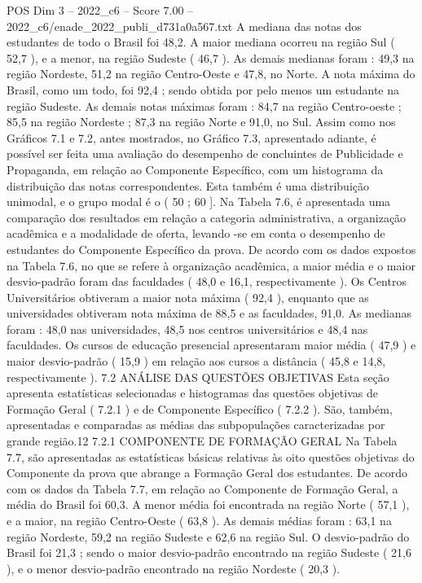 \begin{textsample}{POS Dim 3 – 2022\_c6 – Score 7.00 – 2022\_c6/enade\_2022\_publi\_d731a0a567.txt}
A mediana das notas dos estudantes de todo o Brasil foi 48,2.
A maior mediana ocorreu na região Sul ( 52,7 ), e a menor, na região Sudeste ( 46,7 ).
As demais medianas foram : 49,3 na região Nordeste, 51,2 na região Centro-Oeste e 47,8, no Norte.
A nota máxima do Brasil, como um todo, foi 92,4 ; sendo obtida por pelo menos um estudante na região Sudeste.
As demais notas máximas foram : 84,7 na região Centro-oeste ; 85,5 na região Nordeste ; 87,3 na região Norte e 91,0, no Sul.
Assim como nos Gráficos 7.1 e 7.2, antes mostrados, no Gráfico 7.3, apresentado adiante, é possível ser feita uma avaliação do desempenho de concluintes de Publicidade e Propaganda, em relação ao Componente Específico, com um histograma da distribuição das notas correspondentes.
Esta também é uma distribuição unimodal, e o grupo modal é o ( 50 ; 60 ].
Na Tabela 7.6, é apresentada uma comparação dos resultados em relação a categoria administrativa, a organização acadêmica e a modalidade de oferta, levando -se em conta o desempenho de estudantes do Componente Específico da prova.
De acordo com os dados expostos na Tabela 7.6, no que se refere à organização acadêmica, a maior média e o maior desvio-padrão foram das faculdades ( 48,0 e 16,1, respectivamente ).
Os Centros Universitários obtiveram a maior nota máxima ( 92,4 ), enquanto que as universidades obtiveram nota máxima de 88,5 e as faculdades, 91,0.
As medianas foram : 48,0 nas universidades, 48,5 nos centros universitários e 48,4 nas faculdades.
Os cursos de educação presencial apresentaram maior média ( 47,9 ) e maior desvio-padrão ( 15,9 ) em relação aos cursos a distância ( 45,8 e 14,8, respectivamente ). 7.2 ANÁLISE DAS QUESTÕES OBJETIVAS Esta seção apresenta estatísticas selecionadas e histogramas das questões objetivas de Formação Geral ( 7.2.1 ) e de Componente Específico ( 7.2.2 ).
São, também, apresentadas e comparadas as médias das subpopulações caracterizadas por grande região.12 7.2.1 COMPONENTE DE FORMAÇÃO GERAL Na Tabela 7.7, são apresentadas as estatísticas básicas relativas às oito questões objetivas do Componente da prova que abrange a Formação Geral dos estudantes.
De acordo com os dados da Tabela 7.7, em relação ao Componente de Formação Geral, a média do Brasil foi 60,3.
A menor média foi encontrada na região Norte ( 57,1 ), e a maior, na região Centro-Oeste ( 63,8 ).
As demais médias foram : 63,1 na região Nordeste, 59,2 na região Sudeste e 62,6 na região Sul.
O desvio-padrão do Brasil foi 21,3 ; sendo o maior desvio-padrão encontrado na região Sudeste ( 21,6 ), e o menor desvio-padrão encontrado na região Nordeste ( 20,3 ).

\end{textsample}
